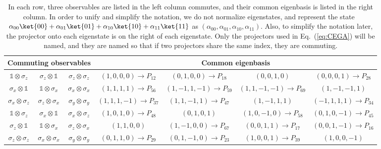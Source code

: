 \documentclass[english,reprint, aps, prl,superscriptaddress, showpacs,
showkeys, longbibliography, amsmath, amssymb]{revtex4-1}
\theoremstyle{plain}
\theoremstyle{definition}
\begin{document}
\begin{table*}
\caption{\label{table:commonBasis}In each row, three observables are listed
in the left column commutes, and their common eigenbasis is listed
in the right column. In order to unify and simplify the notation,
we do not normalize eigenstates, and represent the state~$\alpha_{00}\ket{00}+\alpha_{01}\ket{01}+\alpha_{10}\ket{10}+\alpha_{11}\ket{11}$
as $\left(\alpha_{00},\alpha_{01},\alpha_{10},\alpha_{11}\right)$.
Also, to simplify the notation later, the projector onto each eigenstate
is on the right of each eigenstate. Only the projectors used in Eq.~(\ref{eq:CEGA})
will be named, and they are named so that if two projectors share
the same index, they are commuting.}

\begin{ruledtabular}
\begin{tabular}{ccc|cccc}
\multicolumn{3}{c}{Commuting observables} & \multicolumn{4}{c}{Common eigenbasis}\tabularnewline
\hline 
$\mathbb{1}\otimes\sigma_{z}$  & $\sigma_{z}\otimes\mathbb{1}$  & $\sigma_{z}\otimes\sigma_{z}$  & $(1,0,0,0)\rightarrow P_{12}$  & $(0,1,0,0)\rightarrow P_{18}$  & $(0,0,1,0)$  & $(0,0,0,1)\rightarrow P_{28}$ \tabularnewline
$\sigma_{x}\otimes\mathbb{1}$  & $\mathbb{1}\otimes\sigma_{x}$  & $\sigma_{x}\otimes\sigma_{x}$  & $(1,1,1,1)\rightarrow P_{56}$  & $(1,-1,1,-1)\rightarrow P_{59}$  & $(1,1,-1,-1)\rightarrow P_{69}$  & $(1,-1,-1,1)$ \tabularnewline
$\sigma_{x}\otimes\sigma_{z}$  & $\sigma_{z}\otimes\sigma_{x}$  & $\sigma_{y}\otimes\sigma_{y}$  & $(1,1,1,-1)\rightarrow P_{37}$  & $(1,1,-1,1)\rightarrow P_{47}$  & $(1,-1,1,1)$  & $(-1,1,1,1)\rightarrow P_{34}$ \tabularnewline
$\mathbb{1}\otimes\sigma_{z}$  & $\sigma_{x}\otimes\mathbb{1}$  & $\sigma_{x}\otimes\sigma_{z}$  & $(1,0,1,0)\rightarrow P_{48}$  & $(0,1,0,1)$  & $(1,0,-1,0)\rightarrow P_{58}$  & $(0,1,0,-1)\rightarrow P_{45}$ \tabularnewline
$\sigma_{z}\otimes\mathbb{1}$  & $\mathbb{1}\otimes\sigma_{x}$  & $\sigma_{z}\otimes\sigma_{x}$  & $(1,1,0,0)$  & $(1,-1,0,0)\rightarrow P_{67}$  & $(0,0,1,1)\rightarrow P_{17}$  & $(0,0,1,-1)\rightarrow P_{16}$ \tabularnewline
$\sigma_{z}\otimes\sigma_{z}$  & $\sigma_{x}\otimes\sigma_{x}$  & $\sigma_{y}\otimes\sigma_{y}$  & $(0,1,1,0)\rightarrow P_{29}$  & $(0,1,-1,0)\rightarrow P_{23}$  & $(1,0,0,1)\rightarrow P_{39}$  & $(1,0,0,-1)$ \tabularnewline
\end{tabular}
\end{ruledtabular}

\end{table*}
\end{document}
